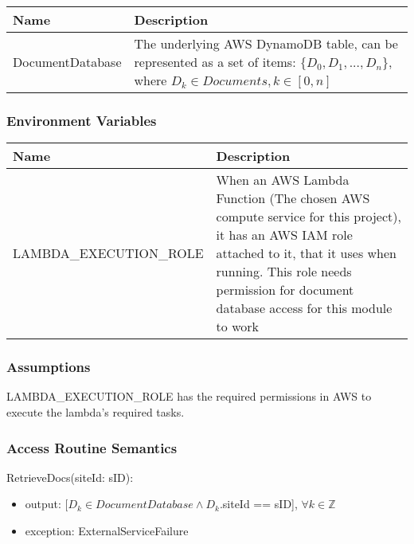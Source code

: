 \documentclass[12pt, titlepage]{article}
\begin{document}
{    \begin{center}
      \begin{tabular}{p{4cm} p{12cm}}
        \hline
        \textbf{Name} & \textbf{Description} \\
        \hline
        DocumentDatabase & The underlying AWS DynamoDB table, can be
        represented as a set of items: $\{D_0, D_1, ..., D_n\}$, where
        $D_k \in Documents, k\in[0,n]$ \\
        \hline
      \end{tabular}
    \end{center}

    \subsubsection{Environment Variables}

    \begin{center}
      \begin{tabular}{p{6cm} p{10cm}}
        \hline
        \textbf{Name} & \textbf{Description} \\
        \hline
        LAMBDA\_EXECUTION\_ROLE & When an AWS Lambda Function (The chosen
        AWS compute service for this project), it has an AWS IAM role
        attached to it, that it uses when running. This role needs
        permission for document database access for this module to work \\
        \hline
      \end{tabular}
    \end{center}

    \subsubsection{Assumptions}

    LAMBDA\_EXECUTION\_ROLE has the required permissions in AWS to
    execute the lambda's required tasks.

    \subsubsection{Access Routine Semantics}

    \noindent RetrieveDocs(siteId: sID):
    \begin{itemize}
      \item output: $[D_{k} \in DocumentDatabase \land D_{k}$.siteId ==
        sID], $\forall
        k \in \mathbb{Z}$
      \item exception: ExternalServiceFailure
    \end{itemize}

}
\end{document}
